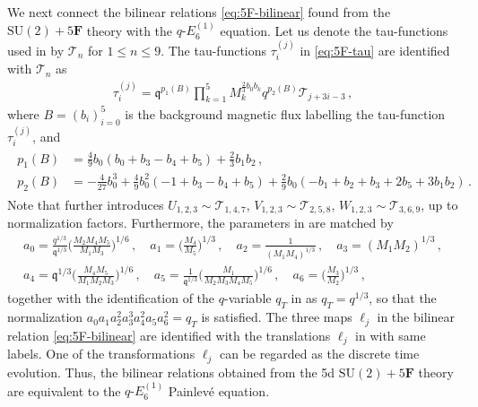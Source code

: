\documentclass[11pt, a4paper]{article}
\theoremstyle{definition}
\begin{document}
We next connect the bilinear relations \eqref{eq:5F-bilinear} found from the $ \mathrm{SU}(2)+5\mathbf{F} $ theory with the $ q\text{-}E_6^{(1)} $ equation. Let us denote the tau-functions used in \cite{Tsuda:2008} by $ \mathcal{T}_n $ for $ 1 \leq n \leq 9 $. The tau-functions $ \tau_i^{(j)} $ in \eqref{eq:5F-tau} are identified with $ \mathcal{T}_n $ as
\begin{align}
    \tau_i^{(j)} = \mathfrak{q}^{p_1(B)} \prod_{k=1}^5 M_k^{\frac{2}{3}b_0 b_k} q^{p_2(B)} \mathcal{T}_{j+3i-3} \, ,
\end{align}
where $ B=(b_i)_{i=0}^5 $ is the background magnetic flux labelling the tau-function $ \tau_i^{(j)} $, and
\begin{align}
    \begin{aligned}
        p_1(B) &= \frac{4}{9} b_0 \left( b_0 + b_3 - b_4 + b_5 \right) + \frac{2}{3} b_1 b_2 \, , \\
        p_2(B) &= -\frac{4}{27} b_0^3 + \frac{4}{9} b_0^2 \left( -1 + b_3 - b_4 + b_5 \right) + \frac{2}{9} b_0 \left( -b_1 + b_2 + b_3 + 2b_5 + 3b_1b_2 \right) \, .
    \end{aligned}
\end{align}
Note that \cite{Tsuda:2008} further introduces $ U_{1,2,3} \sim \mathcal{T}_{1,4,7} $, $ V_{1,2,3} \sim \mathcal{T}_{2,5,8} $, $ W_{1,2,3} \sim \mathcal{T}_{3,6,9} $, up to normalization factors. Furthermore, the parameters in \cite{Tsuda:2008} are matched by
\begin{gather}
    a_0 = \frac{q^{1/3}}{\mathfrak{q}^{1/3}} \biggl(\frac{M_2M_4M_5}{M_1M_3}\biggr)^{1/6} \, , \quad
    a_1 = \biggl(\frac{M_4}{M_5}\biggr)^{\!1/3} \, , \quad
    a_2 = \frac{1}{(M_1M_4)^{1/3}} \, , \quad
    a_3 = (M_1M_2)^{1/3} \, , \nonumber \\
    a_4 = \mathfrak{q}^{1/3} \biggl(\frac{M_4M_5}{M_1M_2M_3}\biggr)^{1/6} \, , \quad
    a_5 = \frac{1}{\mathfrak{q}^{1/3}} \biggl(\frac{M_1}{M_2M_3M_4M_5}\biggr)^{1/6} \, , \quad
    a_6 = \biggl(\frac{M_3}{M_2}\biggr)^{1/3} \, ,
\end{gather}
together with the identification of the $ q $-variable $ q_T $ in \cite{Tsuda:2008} as $ q_T=q^{1/3} $, so that the normalization $ a_0 a_1 a_2^2 a_3^3 a_4^2 a_5 a_6^2=q_T $ is satisfied. The three maps $ \ell_j $ in the bilinear relation \eqref{eq:5F-bilinear} are identified with the translations $ \ell_j $ in \cite{Tsuda:2008} with same labels. One of the transformations $ \ell_j $ can be regarded as the discrete time evolution. Thus, the bilinear relations obtained from the 5d $ \mathrm{SU}(2)+5\mathbf{F} $ theory are equivalent to the $ q\text{-}E_6^{(1)} $ Painlev\'e equation.
\end{document}
